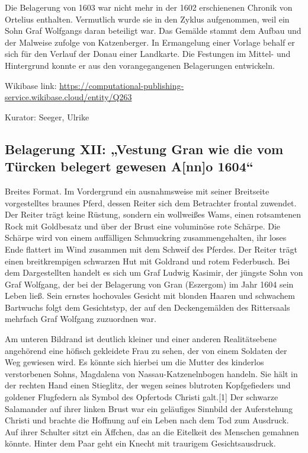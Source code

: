 \documentclass[
  11pt,
  a4paper,
  openany]{book}
\begin{document}
Die Belagerung von 1603 war nicht mehr in der 1602 erschienenen Chronik
von Ortelius enthalten. Vermutlich wurde sie in den Zyklus aufgenommen,
weil ein Sohn Graf Wolfgangs daran beteiligt war. Das Gemälde stammt dem
Aufbau und der Malweise zufolge von Katzenberger. In Ermangelung einer
Vorlage behalf er sich für den Verlauf der Donau einer Landkarte. Die
Festungen im Mittel- und Hintergrund konnte er aus den vorangegangenen
Belagerungen entwickeln.

Wikibase link:
\url{https://computational-publishing-service.wikibase.cloud/entity/Q263}

Kurator: Seeger, Ulrike

\subsection{Belagerung XII: „Vestung Gran wie die vom Türcken belegert
gewesen A{[}nn{]}o
1604``}\label{belagerung-xii-vestung-gran-wie-die-vom-tuxfcrcken-belegert-gewesen-anno-1604}

Breites Format. Im Vordergrund ein ausnahmsweise mit seiner Breitseite
vorgestelltes braunes Pferd, dessen Reiter sich dem Betrachter frontal
zuwendet. Der Reiter trägt keine Rüstung, sondern ein wollweißes Wams,
einen rotsamtenen Rock mit Goldbesatz und über der Brust eine voluminöse
rote Schärpe. Die Schärpe wird von einem auffälligen Schmuckring
zusammengehalten, ihr loses Ende flattert im Wind zusammen mit dem
Schweif des Pferdes. Der Reiter trägt einen breitkrempigen schwarzen Hut
mit Goldrand und rotem Federbusch. Bei dem Dargestellten handelt es sich
um Graf Ludwig Kasimir, der jüngste Sohn von Graf Wolfgang, der bei der
Belagerung von Gran (Eszergom) im Jahr 1604 sein Leben ließ. Sein
ernstes hochovales Gesicht mit blonden Haaren und schwachem Bartwuchs
folgt dem Gesichtstyp, der auf den Deckengemälden des Rittersaals
mehrfach Graf Wolfgang zuzuordnen war.

Am unteren Bildrand ist deutlich kleiner und einer anderen
Realitätsebene angehörend eine höfisch gekleidete Frau zu sehen, der von
einem Soldaten der Weg gewiesen wird. Es könnte sich hierbei um die
Mutter des kinderlos verstorbenen Sohns, Magdalena von
Nassau-Katzenelnbogen handeln. Sie hält in der rechten Hand einen
Stieglitz, der wegen seines blutroten Kopfgefieders und goldener
Flugfedern als Symbol des Opfertods Christi galt.{[}1{]} Der schwarze
Salamander auf ihrer linken Brust war ein geläufiges Sinnbild der
Auferstehung Christi und brachte die Hoffnung auf ein Leben nach dem Tod
zum Ausdruck. Auf ihrer Schulter sitzt ein Äffchen, das an die Eitelkeit
des Menschen gemahnen könnte. Hinter dem Paar geht ein Knecht mit
traurigem Gesichtsausdruck.
\end{document}
